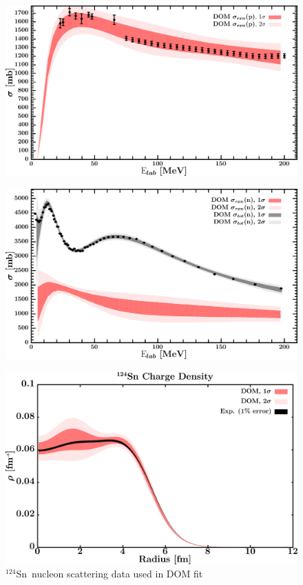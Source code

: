 \documentclass[twocolumn,secnumarabic,amssymb, nobibnotes, aps, prl,
superscriptaddress, nobalancelastpage, draft]{revtex4}
\newcommand{\snFour}{\ensuremath{^{124}}S\lowercase{n}}
\begin{document}
\begin{figure}[!htb]
\begin{minipage}{0.4\linewidth}
        \includegraphics[width=\linewidth]{figures/sn124_protonInelastic.png}
        \label{DOM_sn124_proton_inelastic}
    \end{minipage}\hspace{6pt}
    \begin{minipage}{0.4\linewidth}
        \centering
        \includegraphics[width=\linewidth]{figures/sn124_neutronInelastic.png}
        \label{DOM_sn124_neutron_inelastic}
    \end{minipage}
    \caption{\snFour\ nucleon scattering data used in DOM fit}
    \label{DOM_sn124_scattering}
    \centering
    \begin{minipage}{0.4\linewidth}
        \centering
        \includegraphics[width=\linewidth]{figures/sn124_chargeDensity.png}

\end{minipage}
\end{figure}
\end{document}

